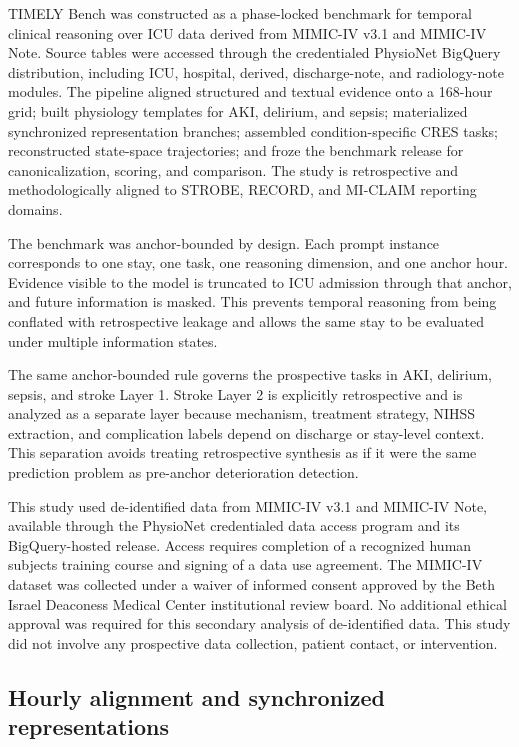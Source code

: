 \documentclass[pdflatex,sn-nature]{sn-jnl}
\begin{document}
TIMELY Bench was constructed as a phase-locked benchmark for temporal clinical reasoning over ICU data derived from MIMIC-IV v3.1 and MIMIC-IV Note\cite{johnson2023mimic}. Source tables were accessed through the credentialed PhysioNet BigQuery distribution, including ICU, hospital, derived, discharge-note, and radiology-note modules. The pipeline aligned structured and textual evidence onto a 168-hour grid; built physiology templates for AKI, delirium, and sepsis; materialized synchronized representation branches; assembled condition-specific CRES tasks; reconstructed state-space trajectories; and froze the benchmark release for canonicalization, scoring, and comparison. The study is retrospective and methodologically aligned to STROBE, RECORD, and MI-CLAIM reporting domains\cite{vonelm2007strobe,benchimol2015record,norgeot2020miclaim}.

The benchmark was anchor-bounded by design. Each prompt instance corresponds to one stay, one task, one reasoning dimension, and one anchor hour. Evidence visible to the model is truncated to ICU admission through that anchor, and future information is masked. This prevents temporal reasoning from being conflated with retrospective leakage and allows the same stay to be evaluated under multiple information states.

The same anchor-bounded rule governs the prospective tasks in AKI, delirium, sepsis, and stroke Layer 1. Stroke Layer 2 is explicitly retrospective and is analyzed as a separate layer because mechanism, treatment strategy, NIHSS extraction, and complication labels depend on discharge or stay-level context. This separation avoids treating retrospective synthesis as if it were the same prediction problem as pre-anchor deterioration detection.

This study used de-identified data from MIMIC-IV v3.1 and MIMIC-IV Note, available through the PhysioNet credentialed data access program and its BigQuery-hosted release. Access requires completion of a recognized human subjects training course and signing of a data use agreement. The MIMIC-IV dataset was collected under a waiver of informed consent approved by the Beth Israel Deaconess Medical Center institutional review board. No additional ethical approval was required for this secondary analysis of de-identified data. This study did not involve any prospective data collection, patient contact, or intervention.

\subsection{Hourly alignment and synchronized representations}
\end{document}
